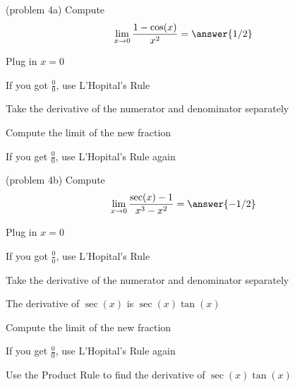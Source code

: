 \documentclass{ximera}
\begin{document}
\begin{problem}(problem 4a)
  Compute
  \[
  \lim_{x \to 0} \frac{1 - \cos(x)}{x^2} = \answer{1/2}
  \]
  
    \begin{hint}
      Plug in $x=0$
    \end{hint}
    \begin{hint}
      If you got $\frac00$, use L'Hopital's Rule
    \end{hint}
    \begin{hint}
      Take the derivative of the numerator and denominator separately
    \end{hint}
	  \begin{hint}
      Compute the limit of the new fraction
    \end{hint}
		\begin{hint}
		 If you get $\frac00$, use L'Hopital's Rule again
    \end{hint}

	
\end{problem}


\begin{problem}(problem 4b)
  Compute
  \[
  \lim_{x \to 0} \frac{\sec(x) - 1}{x^3 - x^2} = \answer{-1/2}
  \]
  
    \begin{hint}
      Plug in $x=0$
    \end{hint}
    \begin{hint}
      If you got $\frac00$, use L'Hopital's Rule
    \end{hint}
    \begin{hint}
      Take the derivative of the numerator and denominator separately
    \end{hint}
		\begin{hint}
		  The derivative of $\sec(x)$ is $\sec(x)\tan(x)$
	  \end{hint}
		\begin{hint}
      Compute the limit of the new fraction
    \end{hint}
		\begin{hint}
		 If you get $\frac00$, use L'Hopital's Rule again
    \end{hint}
		\begin{hint}
		  Use the Product Rule to find the derivative of $\sec(x)\tan(x)$
		\end{hint}
		
\end{problem}
\end{document}
